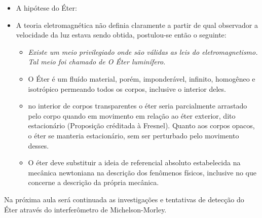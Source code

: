     \begin{itemize}
        \item A hipótese do Éter:
        \item A teoria eletromagnética não definia claramente a partir de qual observador a velocidade da luz estava sendo obtida, postulou-se então o seguinte:
        \begin{itemize}
            \item \emph{Existe um meio privilegiado onde são válidas as leis do eletromagnetismo. Tal meio foi chamado de O Éter luminífero.}
            \item O Éter é um fluído material, porém, imponderável, infinito, homogêneo e isotrópico permeando todos os corpos, inclusive o interior deles.
            \item no interior de corpos transparentes o éter seria parcialmente arrastado pelo corpo quando em movimento em relação ao éter exterior, dito estacionário (Proposição créditada à Fresnel). Quanto aos corpos opacos, o éter se manteria estacionário, sem ser perturbado pelo movimento desses.
            \item O éter deve substituir a ideia de referencial absoluto estabelecida na mecânica newtoniana na descrição dos fenômenos físicos, inclusive no que concerne a descrição da própria mecânica.
        \end{itemize}       
        
    \end{itemize}

       Na próxima aula será continuada as investigações e tentativas de detecção do Éter através do interferômetro de Michelson-Morley.
    



